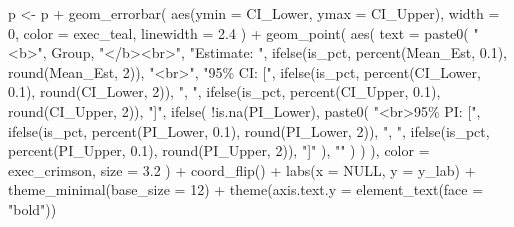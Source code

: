 \documentclass[
  letterpaper,
  DIV=11,
  numbers=noendperiod]{scrartcl}
\newenvironment{Shaded}{\begin{snugshade}}{\end{snugshade}}
\newcommand{\AttributeTok}[1]{\textcolor[rgb]{0.40,0.45,0.13}{#1}}
\newcommand{\ConstantTok}[1]{\textcolor[rgb]{0.56,0.35,0.01}{#1}}
\newcommand{\DecValTok}[1]{\textcolor[rgb]{0.68,0.00,0.00}{#1}}
\newcommand{\FloatTok}[1]{\textcolor[rgb]{0.68,0.00,0.00}{#1}}
\newcommand{\FunctionTok}[1]{\textcolor[rgb]{0.28,0.35,0.67}{#1}}
\newcommand{\NormalTok}[1]{\textcolor[rgb]{0.00,0.23,0.31}{#1}}
\newcommand{\OtherTok}[1]{\textcolor[rgb]{0.00,0.23,0.31}{#1}}
\newcommand{\SpecialCharTok}[1]{\textcolor[rgb]{0.37,0.37,0.37}{#1}}
\newcommand{\StringTok}[1]{\textcolor[rgb]{0.13,0.47,0.30}{#1}}
\begin{document}
\begin{Shaded}
\begin{Highlighting}[]
\NormalTok{    p }\OtherTok{\textless{}{-}}\NormalTok{ p }\SpecialCharTok{+}
      \FunctionTok{geom\_errorbar}\NormalTok{(}
        \FunctionTok{aes}\NormalTok{(}\AttributeTok{ymin =}\NormalTok{ CI\_Lower, }\AttributeTok{ymax =}\NormalTok{ CI\_Upper),}
        \AttributeTok{width =} \DecValTok{0}\NormalTok{, }\AttributeTok{color =}\NormalTok{ exec\_teal, }\AttributeTok{linewidth =} \FloatTok{2.4}
\NormalTok{      ) }\SpecialCharTok{+}
      \FunctionTok{geom\_point}\NormalTok{(}
        \FunctionTok{aes}\NormalTok{(}
          \AttributeTok{text =} \FunctionTok{paste0}\NormalTok{(}
            \StringTok{"\textless{}b\textgreater{}"}\NormalTok{, Group, }\StringTok{"\textless{}/b\textgreater{}\textless{}br\textgreater{}"}\NormalTok{,}
            \StringTok{"Estimate: "}\NormalTok{, }\FunctionTok{ifelse}\NormalTok{(is\_pct, }\FunctionTok{percent}\NormalTok{(Mean\_Est, }\FloatTok{0.1}\NormalTok{), }\FunctionTok{round}\NormalTok{(Mean\_Est, }\DecValTok{2}\NormalTok{)), }\StringTok{"\textless{}br\textgreater{}"}\NormalTok{,}
            \StringTok{"95\% CI: ["}\NormalTok{, }\FunctionTok{ifelse}\NormalTok{(is\_pct, }\FunctionTok{percent}\NormalTok{(CI\_Lower, }\FloatTok{0.1}\NormalTok{), }\FunctionTok{round}\NormalTok{(CI\_Lower, }\DecValTok{2}\NormalTok{)), }\StringTok{", "}\NormalTok{,}
            \FunctionTok{ifelse}\NormalTok{(is\_pct, }\FunctionTok{percent}\NormalTok{(CI\_Upper, }\FloatTok{0.1}\NormalTok{), }\FunctionTok{round}\NormalTok{(CI\_Upper, }\DecValTok{2}\NormalTok{)), }\StringTok{"]"}\NormalTok{,}
            \FunctionTok{ifelse}\NormalTok{(}
              \SpecialCharTok{!}\FunctionTok{is.na}\NormalTok{(PI\_Lower),}
              \FunctionTok{paste0}\NormalTok{(}
                \StringTok{"\textless{}br\textgreater{}95\% PI: ["}\NormalTok{,}
                \FunctionTok{ifelse}\NormalTok{(is\_pct, }\FunctionTok{percent}\NormalTok{(PI\_Lower, }\FloatTok{0.1}\NormalTok{), }\FunctionTok{round}\NormalTok{(PI\_Lower, }\DecValTok{2}\NormalTok{)), }\StringTok{", "}\NormalTok{,}
                \FunctionTok{ifelse}\NormalTok{(is\_pct, }\FunctionTok{percent}\NormalTok{(PI\_Upper, }\FloatTok{0.1}\NormalTok{), }\FunctionTok{round}\NormalTok{(PI\_Upper, }\DecValTok{2}\NormalTok{)), }\StringTok{"]"}
\NormalTok{              ),}
              \StringTok{""}
\NormalTok{            )}
\NormalTok{          )}
\NormalTok{        ),}
        \AttributeTok{color =}\NormalTok{ exec\_crimson, }\AttributeTok{size =} \FloatTok{3.2}
\NormalTok{      ) }\SpecialCharTok{+}
      \FunctionTok{coord\_flip}\NormalTok{() }\SpecialCharTok{+}
      \FunctionTok{labs}\NormalTok{(}\AttributeTok{x =} \ConstantTok{NULL}\NormalTok{, }\AttributeTok{y =}\NormalTok{ y\_lab) }\SpecialCharTok{+}
      \FunctionTok{theme\_minimal}\NormalTok{(}\AttributeTok{base\_size =} \DecValTok{12}\NormalTok{) }\SpecialCharTok{+}
      \FunctionTok{theme}\NormalTok{(}\AttributeTok{axis.text.y =} \FunctionTok{element\_text}\NormalTok{(}\AttributeTok{face =} \StringTok{"bold"}\NormalTok{))}


\end{Highlighting}
\end{Shaded}
\end{document}
